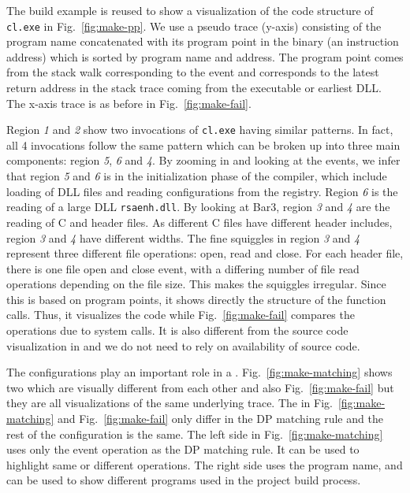 The build example is reused to show a visualization of the code structure
of {\tt cl.exe} in Fig.~\ref{fig:make-pp}.
We use a pseudo trace (y-axis) consisting of the program name
concatenated with its program point in the binary (an instruction address)
which is sorted by program name and address.
The program point comes from the stack walk corresponding to the event
and corresponds to the latest return address in the stack trace
coming from the executable or earliest DLL.
The x-axis trace is as before in Fig.~\ref{fig:make-fail}.

Region {\em 1} and {\em 2} show two invocations of {\tt cl.exe}
having similar patterns.
In fact, all 4 invocations follow the same pattern which can be broken
up into three main components:
region {\em 5}, {\em 6} and {\em 4}.
By zooming in and looking at the events, we infer that
region {\em 5} and {\em 6} is in the initialization phase of the compiler, which include
loading of DLL files and reading configurations from the registry.
Region {\em 6} is the reading of a large DLL {\tt rsaenh.dll}.
By looking at Bar3,
region {\em 3} and {\em 4} are the reading of C and header files.
As different C files have different header includes,
region {\em 3} and {\em 4} have different widths.
The fine squiggles in region {\em 3} and {\em 4} represent
three different file operations: open, read and close.
For each header file, there is one file open and close event,
with a differing number of file read operations depending
on the file size.
This makes the squiggles irregular.
Since this \VDP{} is based on program points, it shows directly the 
structure of the function calls. Thus, it visualizes
the code while Fig.~\ref{fig:make-fail} compares the operations
due to system calls.
It is also different from the source code visualization in \cite{lefebvre2009tralfamadore}
and we do not need to rely on availability of source code.

The configurations play an important role in a \VDP{}.
Fig.~\ref{fig:make-matching} shows two \VDPs{} 
which are visually different from each other and also Fig.~\ref{fig:make-fail}
but they are all visualizations of the same underlying trace.
The \VDPs{} in Fig.~\ref{fig:make-matching} and 
Fig.~\ref{fig:make-fail} only differ in the DP matching rule and
the rest of the configuration is the same.
The left side \VDP{} in Fig.~\ref{fig:make-matching} uses only the event 
operation as the DP matching rule.
It can be used to highlight same or different operations.
The right side \VDP{} uses the program name, and can be used to
show different programs used in the project build process.

